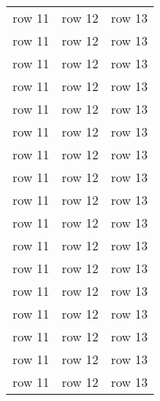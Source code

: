 \documentclass[a4paper, 11pt]{article}
\begin{document}
\begin{center}
\begin{longtable}{| c | c | c |}
    row 11 & row 12 & row 13\\
    row 11 & row 12 & row 13\\
    row 11 & row 12 & row 13\\
    row 11 & row 12 & row 13\\
    row 11 & row 12 & row 13\\
    row 11 & row 12 & row 13\\
    row 11 & row 12 & row 13\\
    row 11 & row 12 & row 13\\
    row 11 & row 12 & row 13\\
    row 11 & row 12 & row 13\\
    row 11 & row 12 & row 13\\
    row 11 & row 12 & row 13\\
    row 11 & row 12 & row 13\\
    row 11 & row 12 & row 13\\
    row 11 & row 12 & row 13\\
    row 11 & row 12 & row 13\\
    row 11 & row 12 & row 13\\
    
    \end{longtable}
\end{center}
\end{document}
